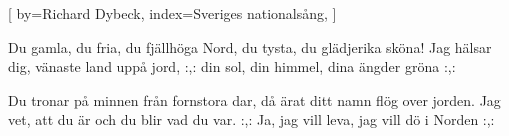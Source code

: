 

[
by={Richard Dybeck},
index={Sveriges nationalsång},
]

\beginverse*
 Du gamla, du fria, du fjällhöga Nord,
du tysta, du glädjerika sköna!
Jag hälsar dig, vänaste land uppå jord,
:,: din sol, din himmel, dina ängder gröna :,:
\endverse

\beginverse*
Du tronar på minnen från fornstora dar, 
då ärat ditt namn flög over jorden.
Jag vet, att du är och du blir vad du var.
:,: Ja, jag vill leva, jag vill dö i Norden :,:
\endverse
\endsong


